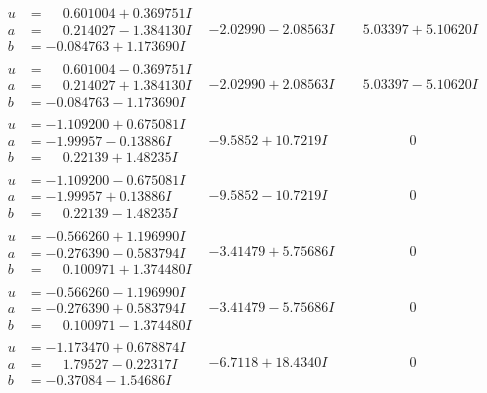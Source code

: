 \documentclass[1p]{elsarticle_modified}
\theoremstyle{definition}
\begin{document}
$$\begin{array}{c|c|c}
\begin{aligned}
u &= \phantom{-}0.601004 + 0.369751 I \\
a &= \phantom{-}0.214027 - 1.384130 I \\
b &= -0.084763 + 1.173690 I\end{aligned}
 & -2.02990 - 2.08563 I & \phantom{-}5.03397 + 5.10620 I \\ \hline\begin{aligned}
u &= \phantom{-}0.601004 - 0.369751 I \\
a &= \phantom{-}0.214027 + 1.384130 I \\
b &= -0.084763 - 1.173690 I\end{aligned}
 & -2.02990 + 2.08563 I & \phantom{-}5.03397 - 5.10620 I \\ \hline\begin{aligned}
u &= -1.109200 + 0.675081 I \\
a &= -1.99957 - 0.13886 I \\
b &= \phantom{-}0.22139 + 1.48235 I\end{aligned}
 & -9.5852 + 10.7219 I & \phantom{-0.000000 } 0 \\ \hline\begin{aligned}
u &= -1.109200 - 0.675081 I \\
a &= -1.99957 + 0.13886 I \\
b &= \phantom{-}0.22139 - 1.48235 I\end{aligned}
 & -9.5852 - 10.7219 I & \phantom{-0.000000 } 0 \\ \hline\begin{aligned}
u &= -0.566260 + 1.196990 I \\
a &= -0.276390 - 0.583794 I \\
b &= \phantom{-}0.100971 + 1.374480 I\end{aligned}
 & -3.41479 + 5.75686 I & \phantom{-0.000000 } 0 \\ \hline\begin{aligned}
u &= -0.566260 - 1.196990 I \\
a &= -0.276390 + 0.583794 I \\
b &= \phantom{-}0.100971 - 1.374480 I\end{aligned}
 & -3.41479 - 5.75686 I & \phantom{-0.000000 } 0 \\ \hline\begin{aligned}
u &= -1.173470 + 0.678874 I \\
a &= \phantom{-}1.79527 - 0.22317 I \\
b &= -0.37084 - 1.54686 I\end{aligned}
 & -6.7118 + 18.4340 I & \phantom{-0.000000 } 0 \\ \hline\begin{aligned}

\end{aligned}
\end{array}$$
\end{document}
